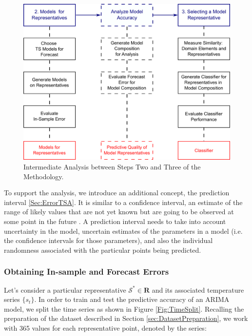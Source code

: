 \begin{figure}[h!]
	\centering
	\includegraphics[scale=0.18]{../Figures/Experiements_Methodology_Step2_Step3}
	\caption{Intermediate Analysis between Steps Two and Three of the Methodology.}
	\label{Fig:MethodologyExperiments}
\end{figure}

To support the analysis, we introduce an additional concept, the prediction interval \ref{Sec:ErrorTSA}. It is  similar to a confidence interval, an estimate of the range of likely values that are not yet known but are going to be observed at some point in the future \cite{Chatfield2001}. A prediction interval needs to take into account uncertainty in the model, uncertain estimates of the parameters in a model (i.e. the confidence intervals for those parameters), and also the individual randomness associated with the particular points being predicted.

\subsubsection{Obtaining In-sample and Forecast Errors}
\label{sec:InSampleForecastErrors}

Let's consider a particular representative $\mathcal{S}^{*} \in \mathbf{R}$ and its associated temperature series $\lbrace s_t \rbrace$. In order to train and test the predictive accuracy of an ARIMA model, we split the time series as shown in Figure \ref{Fig:TimeSplit}. Recalling the preparation of the dataset described in Section \ref{sec:DatasetPreparation}, we work with 365 values for each representative point, denoted by the series:

